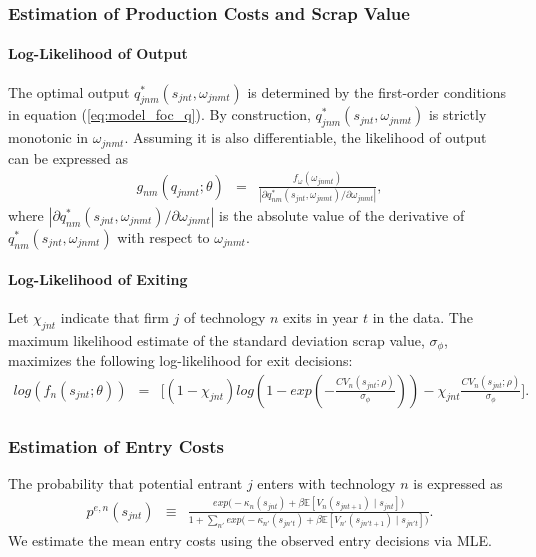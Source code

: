 \documentclass[12pt, letter]{article}
\begin{document}
\subsubsection{Estimation of Production Costs and Scrap Value}

\paragraph{Log-Likelihood of Output}
The optimal output $q^*_{jnm}(s_{jnt},\omega_{jnmt})$ is determined by the first-order conditions in equation (\ref{eq:model_foc_q}). By construction, $q^*_{jnm}(s_{jnt},\omega_{jnmt})$ is strictly monotonic in $\omega_{jnmt}$. Assuming it is also differentiable,  the likelihood of output can be expressed as
\begin{eqnarray}
    g_{nm}(q_{jnmt};\theta) &=& \frac{f_\omega(\omega_{jnmt})}{|\partial q_{nm}^*(s_{jnt},\omega_{jnmt}) /\partial \omega_{jnmt}|},\label{eq:est_log_likelihood_output}
\end{eqnarray}
where $|\partial q_{nm}^*(s_{jnt},\omega_{jnmt}) /\partial \omega_{jnmt}|$ is the absolute value of the derivative of $q_{nm}^*(s_{jnt},\omega_{jnmt})$ with respect to $\omega_{jnmt}$.

\paragraph{Log-Likelihood of Exiting}
Let $\chi_{jnt}$ indicate that firm $j$ of technology $n$ exits in year $t$ in the data. The maximum likelihood estimate of the standard deviation scrap value, $\sigma_\phi$, maximizes the following log-likelihood for exit decisions:
\begin{eqnarray}
    log(f_n(s_{jnt};\theta)) &=& \Big[ (1-\chi_{jnt}) log(1-exp(-\frac{CV_n(s_{jnt};\rho)}{\sigma_\phi})) - \chi_{jnt} \frac{CV_n(s_{jnt};\rho)}{\sigma_\phi} \Big]. \label{eq:est_log_likelihood_exit}   
\end{eqnarray}


\subsubsection{Estimation of Entry Costs}
The probability that potential entrant $j$ enters with technology $n$ is expressed as
\begin{eqnarray}
  p^{e,n}(s_{jnt}) & \equiv & \frac{exp\Big(-\kappa_n(s_{jnt}) + \beta \mathbb{E}[V_n(s_{jnt+1}) \mid s_{jnt}] \Big)}{1 + \sum_{n'} exp\Big(-\kappa_{n'}(s_{jn't}) + \beta \mathbb{E}[V_{n'}(s_{jn't+1}) \mid s_{jn't}]\Big)}. %
\end{eqnarray}
We estimate the mean entry costs using the observed entry decisions via MLE.
\end{document}
